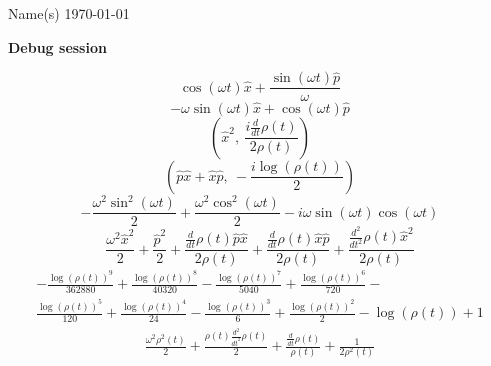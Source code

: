 \documentclass[12pt]{article}
\begin{document}
\noindent Name(s) \hfill \today \\[30pt]
\centerline{ \Large{ \textbf{ Debug session}}}
\begin{equation}
	\cos{\left(\omega t \right)} \hat{x} + \frac{\sin{\left(\omega t \right)} \hat{p}}{\omega}
\end{equation}
\begin{equation*}
	- \omega \sin{\left(\omega t \right)} \hat{x} + \cos{\left(\omega t \right)} \hat{p}
\end{equation*}
\begin{equation*}
	\left( \hat{x}^{2}, \  \frac{i \frac{d}{d t} \rho{\left(t \right)}}{2 \rho{\left(t \right)}}\right)
\end{equation*}
\begin{equation*}
	\left( \hat{p} \hat{x} + \hat{x} \hat{p}, \  - \frac{i \log{\left(\rho{\left(t \right)} \right)}}{2}\right)
\end{equation*}
\begin{equation*}
	- \frac{\omega^{2} \sin^{2}{\left(\omega t \right)}}{2} + \frac{\omega^{2} \cos^{2}{\left(\omega t \right)}}{2} - i \omega \sin{\left(\omega t \right)} \cos{\left(\omega t \right)}
\end{equation*}
\begin{equation*}
	\frac{\omega^{2} \hat{x}^{2}}{2} + \frac{\hat{p}^{2}}{2} + \frac{\frac{d}{d t} \rho{\left(t \right)} \hat{p} \hat{x}}{2 \rho{\left(t \right)}} + \frac{\frac{d}{d t} \rho{\left(t \right)} \hat{x} \hat{p}}{2 \rho{\left(t \right)}} + \frac{\frac{d^{2}}{d t^{2}} \rho{\left(t \right)} \hat{x}^{2}}{2 \rho{\left(t \right)}}
\end{equation*}
\begin{align*}
	- \frac{\log{\left(\rho{\left(t \right)} \right)}^{9}}{362880} + \frac{\log{\left(\rho{\left(t \right)} \right)}^{8}}{40320} - \frac{\log{\left(\rho{\left(t \right)} \right)}^{7}}{5040} + \frac{\log{\left(\rho{\left(t \right)} \right)}^{6}}{720} - \\
	\frac{\log{\left(\rho{\left(t \right)} \right)}^{5}}{120} + \frac{\log{\left(\rho{\left(t \right)} \right)}^{4}}{24} - \frac{\log{\left(\rho{\left(t \right)} \right)}^{3}}{6} + \frac{\log{\left(\rho{\left(t \right)} \right)}^{2}}{2} - \log{\left(\rho{\left(t \right)} \right)} + 1
\end{align*}
\begin{align*}
	\frac{\omega^{2} \rho^{2}{\left(t \right)}}{2} + \frac{\rho{\left(t \right)} \frac{d^{2}}{d t^{2}} \rho{\left(t \right)}}{2} + \frac{\frac{d}{d t} \rho{\left(t \right)}}{\rho{\left(t \right)}} + \frac{1}{2 \rho^{2}{\left(t \right)}}
\end{align*}
\end{document}

